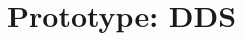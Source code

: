 \documentclass[Main]{subfiles}
\begin{document}
\chapter{Prototype: DDS}

%
%
%
%
%
%
\end{document}
